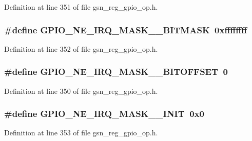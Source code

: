 Definition at line 351 of file gsn\_\-reg\_\-gpio\_\-op.h.

\hypertarget{a00553_aeb40c8aadc233e72142d7d7dac048081}{
\subsubsection[{GPIO\_\-NE\_\-IRQ\_\-MASK\_\-0\_\-BITMASK}]{\setlength{\rightskip}{0pt plus 5cm}\#define GPIO\_\-NE\_\-IRQ\_\-MASK\_\_\-BITMASK~0xffffffff}}
\label{a00553_aeb40c8aadc233e72142d7d7dac048081}


Definition at line 352 of file gsn\_\-reg\_\-gpio\_\-op.h.

\hypertarget{a00553_ab5a1f255cdf1949c4b01416848784780}{
\subsubsection[{GPIO\_\-NE\_\-IRQ\_\-MASK\_\-0\_\-BITOFFSET}]{\setlength{\rightskip}{0pt plus 5cm}\#define GPIO\_\-NE\_\-IRQ\_\-MASK\_\_\-BITOFFSET~0}}
\label{a00553_ab5a1f255cdf1949c4b01416848784780}


Definition at line 350 of file gsn\_\-reg\_\-gpio\_\-op.h.

\hypertarget{a00553_a3f14b8bce304288ec65a58a5d9d4e576}{
\subsubsection[{GPIO\_\-NE\_\-IRQ\_\-MASK\_\-0\_\-INIT}]{\setlength{\rightskip}{0pt plus 5cm}\#define GPIO\_\-NE\_\-IRQ\_\-MASK\_\_\-INIT~0x0}}
\label{a00553_a3f14b8bce304288ec65a58a5d9d4e576}


Definition at line 353 of file gsn\_\-reg\_\-gpio\_\-op.h.

